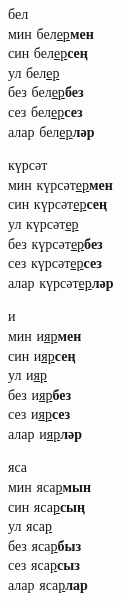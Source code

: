 \begin{multicols}{4}
\begin{enumerate}
\begin{minipage}{\linewidth}
    \item
    бел\\
    мин бел\underline{ер}\textbf{мен}\\
    син бел\underline{ер}\textbf{сең}\\
    ул бел\underline{ер}\\
    без бел\underline{ер}\textbf{без}\\
    сез бел\underline{ер}\textbf{сез}\\
    алар бел\underline{ер}\textbf{ләр}\\
\end{minipage}

\begin{minipage}{\linewidth}
    \item
    күрсәт\\
    мин күрсәт\underline{ер}\textbf{мен}\\
    син күрсәт\underline{ер}\textbf{сең}\\
    ул күрсәт\underline{ер}\\
    без күрсәт\underline{ер}\textbf{без}\\
    сез күрсәт\underline{ер}\textbf{сез}\\
    алар күрсәт\underline{ер}\textbf{ләр}\\
\end{minipage}

\begin{minipage}{\linewidth}
    \item
    и\\
    мин и\underline{яр}\textbf{мен}\\
    син и\underline{яр}\textbf{сең}\\
    ул и\underline{яр}\\
    без и\underline{яр}\textbf{без}\\
    сез и\underline{яр}\textbf{сез}\\
    алар и\underline{яр}\textbf{ләр}\\
\end{minipage}

\begin{minipage}{\linewidth}
    \item
    яса\\
    мин яса\underline{р}\textbf{мын}\\
    син яса\underline{р}\textbf{сың}\\
    ул яса\underline{р}\\
    без яса\underline{р}\textbf{быз}\\
    сез яса\underline{р}\textbf{сыз}\\
    алар яса\underline{р}\textbf{лар}\\
\end{minipage}


\end{enumerate}
\end{multicols}
